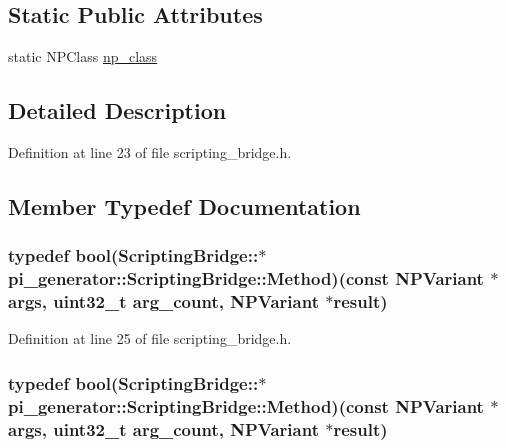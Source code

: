 \subsection*{Static Public Attributes}
\begin{DoxyCompactItemize}
\item 
static NPClass \hyperlink{classpi__generator_1_1_scripting_bridge_a7a3e8318e9e315a116729cebceac5fd9}{np\_\-class}
\end{DoxyCompactItemize}


\subsection{Detailed Description}


Definition at line 23 of file scripting\_\-bridge.h.



\subsection{Member Typedef Documentation}
\hypertarget{classpi__generator_1_1_scripting_bridge_a48f5f7b0dfb3daabcdbfb3f7b667fd39}{
\subsubsection[{Method}]{\setlength{\rightskip}{0pt plus 5cm}typedef bool(ScriptingBridge::$\ast$ {\bf pi\_\-generator::ScriptingBridge::Method})(const NPVariant $\ast$args, uint32\_\-t arg\_\-count, NPVariant $\ast$result)}}
\label{classpi__generator_1_1_scripting_bridge_a48f5f7b0dfb3daabcdbfb3f7b667fd39}


Definition at line 25 of file scripting\_\-bridge.h.

\hypertarget{classpi__generator_1_1_scripting_bridge_a48f5f7b0dfb3daabcdbfb3f7b667fd39}{
\subsubsection[{Method}]{\setlength{\rightskip}{0pt plus 5cm}typedef bool(ScriptingBridge::$\ast$ {\bf pi\_\-generator::ScriptingBridge::Method})(const NPVariant $\ast$args, uint32\_\-t arg\_\-count, NPVariant $\ast$result)}}
\label{classpi__generator_1_1_scripting_bridge_a48f5f7b0dfb3daabcdbfb3f7b667fd39}


